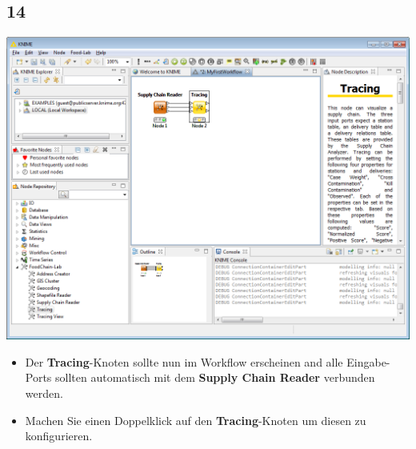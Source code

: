\documentclass{beamer}
\begin{document}
\subsection{14}
\begin{frame}
	\begin{center}
  		\includegraphics[height=0.6\textheight]{14.png}
	\end{center}
	\begin{itemize}
		\item Der \textbf{Tracing}-Knoten sollte nun im Workflow erscheinen and alle Eingabe-Ports sollten automatisch mit dem \textbf{Supply Chain Reader} verbunden werden.
		\item Machen Sie einen Doppelklick auf den \textbf{Tracing}-Knoten um diesen zu konfigurieren.
	\end{itemize}
\end{frame}
\end{document}
